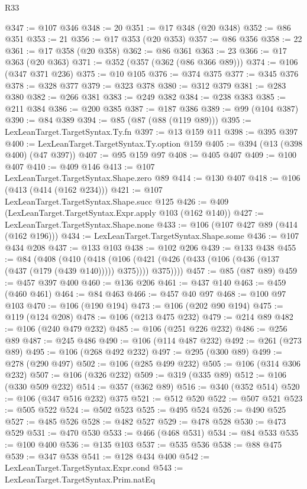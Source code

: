 \begin{lexlean}{R33}
\begin{coremodule}
@347 := @107 @346
@348 := 20
@351 := @17 @348 (@20 @348)
@352 := @86 @351
@353 := 21
@356 := @17 @353 (@20 @353)
@357 := @86 @356
@358 := 22
@361 := @17 @358 (@20 @358)
@362 := @86 @361
@363 := 23
@366 := @17 @363 (@20 @363)
@371 := @352 (@357 (@362 (@86 @366 @89)))
@374 := @106 (@347 @371 @236)
@375 := @10 @105
@376 := @374 @375
@377 := @345 @376
@378 := @328 @377
@379 := @323 @378
@380 := @312 @379
@381 := @283 @380
@382 := @266 @381
@383 := @249 @382
@384 := @238 @383
@385 := @211 @384
@386 := @200 @385
@387 := @187 @386
@389 := @99 (@104 @387)
@390 := @84 @389
@394 := @85 (@87 (@88 (@119 @89)))
@395 := LexLeanTarget.TargetSyntax.Ty.fn
@397 := @13 @159 @11
@398 := @395 @397
@400 := LexLeanTarget.TargetSyntax.Ty.option @159
@405 := @394 (@13 (@398 @400) (@47 @397))
@407 := @95 @159 @97
@408 := @405 @407
@409 := @100 @407
@410 := @409 @146
@413 := @107 LexLeanTarget.TargetSyntax.Shape.zero @89
@414 := @130 @407
@418 := @106 (@413 (@414 (@162 @234)))
@421 := @107 LexLeanTarget.TargetSyntax.Shape.succ @125
@426 := @409 (LexLeanTarget.TargetSyntax.Expr.apply @103 (@162 @140))
@427 := LexLeanTarget.TargetSyntax.Shape.none
@433 := @106 (@107 @427 @89 (@414 (@162 @196)))
@434 := LexLeanTarget.TargetSyntax.Shape.some
@436 := @107 @434 @208
@437 := @133 @103
@438 := @102 @206
@439 := @133 @438
@455 := @84
    (@408
      (@410
        (@418
          (@106 (@421 (@426 (@433 (@106 (@436 (@137 (@437 (@179 (@439 @140))))) @375)))) @375))))
@457 := @85 (@87 @89)
@459 := @457 @397 @400
@460 := @136 @206
@461 := @437 @140
@463 := @459 (@460 @461)
@464 := @84 @463
@466 := @457 @40 @97
@468 := @100 @97 @103
@470 := @106 (@190 @194)
@473 := @106 (@202 @90 @194)
@475 := @119 (@124 @208)
@478 := @106 (@213 @475 @232)
@479 := @214 @89
@482 := @106 (@240 @479 @232)
@485 := @106 (@251 @226 @232)
@486 := @256 @89
@487 := @245 @486
@490 := @106 (@114 @487 @232)
@492 := @261 (@273 @89)
@495 := @106 (@268 @492 @232)
@497 := @295 (@300 @89)
@499 := @278 (@290 @497)
@502 := @106 (@285 @499 @232)
@505 := @106 (@314 @306 @232)
@507 := @106 (@326 @232)
@509 := @319 (@335 @89)
@512 := @106 (@330 @509 @232)
@514 := @357 (@362 @89)
@516 := @340 (@352 @514)
@520 := @106 (@347 @516 @232) @375
@521 := @512 @520
@522 := @507 @521
@523 := @505 @522
@524 := @502 @523
@525 := @495 @524
@526 := @490 @525
@527 := @485 @526
@528 := @482 @527
@529 := @478 @528
@530 := @473 @529
@531 := @470 @530
@533 := @466 (@468 @531)
@534 := @84 @533
@535 := @100 @400
@536 := @135 @103
@537 := @535 @536
@538 := @88 @475
@539 := @347 @538
@541 := @128 @434 @400
@542 := LexLeanTarget.TargetSyntax.Expr.cond
@543 := LexLeanTarget.TargetSyntax.Prim.natEq

\end{coremodule}
\end{lexlean}
